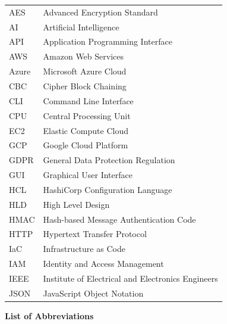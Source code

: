\begin{center}
\begin{tabular}{l l}
AES & Advanced Encryption Standard \\
AI & Artificial Intelligence \\
API & Application Programming Interface \\
AWS & Amazon Web Services \\
Azure & Microsoft Azure Cloud \\
CBC & Cipher Block Chaining \\
CLI & Command Line Interface \\
CPU & Central Processing Unit \\
EC2 & Elastic Compute Cloud \\
GCP & Google Cloud Platform \\
GDPR & General Data Protection Regulation \\
GUI & Graphical User Interface \\
HCL & HashiCorp Configuration Language \\
HLD & High Level Design \\
HMAC & Hash-based Message Authentication Code \\
HTTP & Hypertext Transfer Protocol \\
IaC & Infrastructure as Code \\
IAM & Identity and Access Management \\
IEEE & Institute of Electrical and Electronics Engineers \\
JSON & JavaScript Object Notation \\
\end{tabular}
\end{center}

\newpage
\begin{center}
    {\Huge \textbf{List of Abbreviations}}
\end{center}
\vspace{1.5cm}

